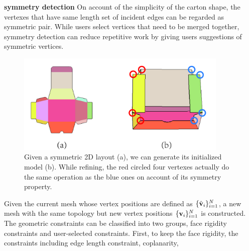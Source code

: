
\noindent
\textbf{symmetry detection} On account of the simplicity of the carton shape, the vertexes that have same length set of incident edges can be regarded as symmetric pair. While users select vertices that need to be merged together, symmetry detection can reduce repetitive work by giving users suggestions of symmetric vertices.

{}

\begin{figure}
	\centering
	\includegraphics[width=0.9\textwidth]{images/symmetry.jpg}
	\caption{Given a symmetric 2D layout (a), we can generate its initialized model (b). While refining, the red circled four vertexes actually do the same operation as the blue ones on account of its symmetry property.}
	\label{fig:symmetry}
\end{figure}

Given the current mesh whose vertex positions are defined as $\{\hat{\mathbf{v}}_i\}^{N}_{i=1}$, a new mesh with the same topology but new vertex positions $\{\mathbf{v}_i\}^{N}_{i=1}$ is constructed.
%
The geometric constraints can be classified into two groups, face rigidity constraints and user-selected constraints. 
First, to keep the face rigidity, the constraints including edge length constraint, coplanarity, 


